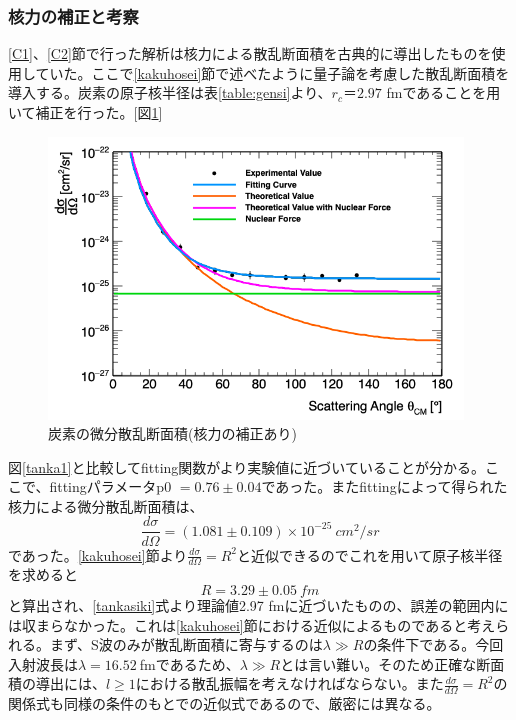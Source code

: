 \documentclass[a4paper,11pt,dvipdfmx]{jsarticle}
\begin{document}
\newpage
\subsubsection{核力の補正と考察}
\ref{C1}、\ref{C2}節で行った解析は核力による散乱断面積を古典的に導出したものを使用していた。ここで\ref{kakuhosei}節で述べたように量子論を考慮した散乱断面積を導入する。炭素の原子核半径は表\ref{table:gensi}より、$r_c＝2.97 $ fmであることを用いて補正を行った。[図\ref{c_cs_hosei}]
\begin{figure}[H]
    \centering
        \includegraphics[width=110mm]{picture/jan/C5.png}
    \caption{炭素の微分散乱断面積(核力の補正あり)}
    \label{c_cs_hosei}
\end{figure}
図\ref{tanka1}と比較してfitting関数がより実験値に近づいていることが分かる。ここで、fittingパラメータp0 $= 0.76 \pm 0.04$であった。またfittingによって得られた核力による微分散乱断面積は、
\begin{equation}
    \frac{d\sigma}{d\Omega} = \left( 1.081 \pm 0.109 \right) \times 10^{-25} \:cm^2/sr
\end{equation}
であった。\ref{kakuhosei}節より$\frac{d\sigma}{d\Omega}=R^2$と近似できるのでこれを用いて原子核半径を求めると
\begin{equation}
    R = 3.29 \pm 0.05 \: fm
\end{equation}
と算出され、\ref{tankasiki}式より理論値2.97 fmに近づいたものの、誤差の範囲内には収まらなかった。これは\ref{kakuhosei}節における近似によるものであると考えられる。まず、S波のみが散乱断面積に寄与するのは$\lambda \gg R$の条件下である。今回入射波長は$\lambda=16.52\:$fmであるため、$\lambda \gg R$とは言い難い。そのため正確な断面積の導出には、$l\geq1$における散乱振幅を考えなければならない。また$\frac{d\sigma}{d\Omega}=R^2$の関係式も同様の条件のもとでの近似式であるので、厳密には異なる。
\end{document}
